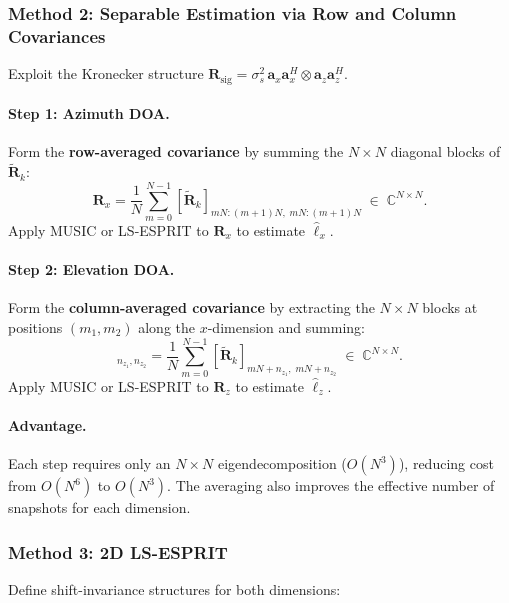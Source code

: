 \documentclass[11pt,a4paper]{article}
\newcommand{\C}{\mathbb{C}}
\begin{document}
\subsubsection{Method 2: Separable Estimation via Row and Column
Covariances}
\label{sec:separable_doa}

Exploit the Kronecker structure
$\mathbf{R}_{\mathrm{sig}}=\sigma_s^2\,
\mathbf{a}_x\mathbf{a}_x^H\otimes\mathbf{a}_z\mathbf{a}_z^H$.

\paragraph{Step 1: Azimuth DOA.}
Form the \textbf{row-averaged covariance} by summing the $N\times N$
diagonal blocks of $\tilde{\mathbf{R}}_k$:
\begin{equation}
  \mathbf{R}_x = \frac{1}{N}\sum_{m=0}^{N-1}
  [\tilde{\mathbf{R}}_k]_{mN:(m+1)N,\;mN:(m+1)N}
  \;\in\;\C^{N\times N}.
  \label{eq:Rx}
\end{equation}
Apply MUSIC or LS-ESPRIT to $\mathbf{R}_x$ to estimate $\hat{\ell}_x$.

\paragraph{Step 2: Elevation DOA.}
Form the \textbf{column-averaged covariance} by extracting the
$N\times N$ blocks at positions $(m_1,m_2)$ along the
$x$-dimension and summing:
\begin{equation}
  [\mathbf{R}_z]_{n_{z_1},n_{z_2}}
  = \frac{1}{N}\sum_{m=0}^{N-1}
  [\tilde{\mathbf{R}}_k]_{mN+n_{z_1},\;mN+n_{z_2}}
  \;\in\;\C^{N\times N}.
  \label{eq:Rz}
\end{equation}
Apply MUSIC or LS-ESPRIT to $\mathbf{R}_z$ to estimate $\hat{\ell}_z$.

\paragraph{Advantage.}
Each step requires only an $N\times N$ eigendecomposition ($O(N^3)$),
reducing cost from $O(N^6)$ to $O(N^3)$.  The averaging also improves
the effective number of snapshots for each dimension.

\subsubsection{Method 3: 2D LS-ESPRIT}
\label{sec:2d_esprit}

Define shift-invariance structures for both dimensions:
\end{document}
